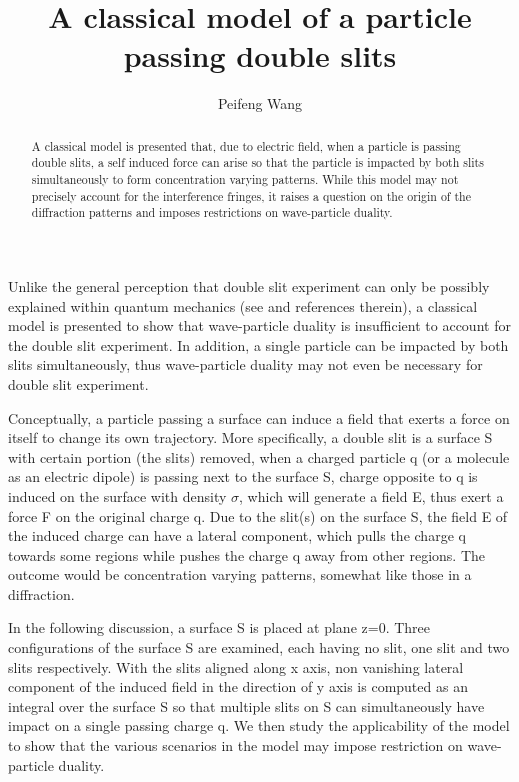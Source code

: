 \documentclass[prd,showpacs,twocolumn]{revtex4-1}
\begin{document}
\title{A classical model of a particle passing double slits}
\author{Peifeng Wang}
\address{Guanghua Road 1\#, 34-1-3-5, Yanta District, Xi'an, Shaanxi, P. R. China 710075}
\address{Mijiaqiao 34-1-5, Xi'an, Shaanxi, P. R. China 710075}
\begin{abstract}
A classical model is presented that, due to electric field, when a particle is passing double slits, a self induced force can arise so that the particle is impacted by both slits simultaneously to form concentration varying patterns. While this model may not precisely account for the interference fringes, it raises a question on the origin of the diffraction patterns and imposes restrictions on wave-particle duality.
\end{abstract}
\maketitle

Unlike the general perception that double slit experiment can only be possibly explained within quantum mechanics (see \cite{Juffmann,Bach} and references therein), a classical model is presented to show that wave-particle duality is insufficient to account for the double slit experiment. In addition, a single particle can be impacted by both slits simultaneously, thus wave-particle duality may not even be necessary for double slit experiment.

Conceptually, a particle passing a surface can induce a field that exerts a force on itself to change its own trajectory. More specifically, a double slit is a surface S with certain portion (the slits) removed, when a charged particle q (or a molecule as an electric dipole) is passing next to the surface S, charge opposite to q is induced on the surface with density $\sigma$, which will generate a field E, thus exert a force F on the original charge q. Due to the slit(s) on the surface S, the field E of the induced charge can have a lateral component, which pulls the charge q towards some regions while pushes the charge q away from other regions. The outcome would be concentration varying patterns, somewhat like those in a diffraction.

In the following discussion, a surface S is placed at plane z=0. Three configurations of the surface S are examined, each having no slit, one slit and two slits respectively. With the slits aligned along x axis, non vanishing lateral component of the induced field in the direction of y axis is computed as an integral over the surface S so that multiple slits on S can simultaneously have impact on a single passing charge q. We then study the applicability of the model to show that the various scenarios in the model may impose restriction on wave-particle duality.
\end{document}

